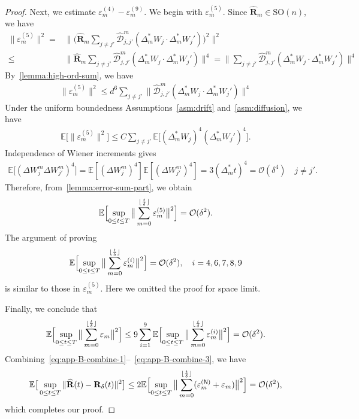\documentclass[11pt, a4paper, onecolumn]{article}
\newcommand{\SOn}{\mathrm{SO}(n)}
\newcommand{\E}{\mathbb{E}}
\newcommand{\m}{m}
\newcommand{\bfR}{\mathbf{R}}
\newcommand{\hatR}{\widehat{\bfR}}
\newcommand{\hatD}{\widehat{\tg D}}
\newcommand{\tg}[1]{\mathcal{#1}}
\newcommand{\nm}[1]{\mathsf{#1}}
\newcommand{\calO}{\mathcal{O}}
\newcommand{\Dms}{{\Delta^{*}_{m}}}
\newcommand{\hDjjpms}{ {\hatD_{j,j'}^{\m}} }
\newcommand{\sumub}{{\lfloor \frac{t}{\delta} \rfloor}}
\newcommand{\ermn}[1]{\varepsilon_m^{(#1)}}
\newcommand{\EsupN}[1]{\E\Bigl[ \sup_{0 \le t\le T} \big\| \sum_{m=0}^{\sumub} #1 \big\|^2 \Bigr]}
\begin{document}
\begin{appendices}
\begin{proof}
Next, we estimate $\ermn{4}-\ermn{9}$. We begin with $\ermn{5}$. Since $\hatR_{m}\in\SOn$, we have
    \begin{align*}
        \| \ermn{5}\|^2 = &  \Big\| \Big( \hatR_m \sum_{j\neq j'} \hDjjpms (\Dms W_j \cdot \Dms W_j')\Big)^2 \Big\|^2 \\
                        \le &  \Big\|  \hatR_m \sum_{j\neq j'} \hDjjpms (\Dms W_j \cdot \Dms W_j') \Big\|^4 =  \Big\|  \sum_{j\neq j'} \hDjjpms (\Dms W_j \cdot \Dms W_j') \Big\|^4
    \end{align*}    
    By~\cref{lemma:high-ord-sum}, we have
    \begin{align*}
         \| \ermn{5}\|^2 \le d^6 \sum_{j\neq j'} \|\hDjjpms (\Dms W_j \cdot \Dms W_j') \|^4 
    \end{align*}
    Under the uniform boundedness Assumptions~\ref{asm:drift} and~\ref{asm:diffusion}, we have
    \begin{align*}
        \E\big[\| \ermn{5}\|^2\big] \le C\sum_{j\neq j'} \E\big[(\Dms W_j)^4 (\Dms W_j')^4\big].
    \end{align*}
    Independence of Wiener increments gives
    \begin{align*}
       \mathbb E \bigl[(\Delta W_{j}^{m}\Delta W_{j'}^{m})^{4}\bigr] = \mathbb E[(\Delta W_{j}^{m})^{4}] \mathbb E[(\Delta W_{j'}^{m})^{4}] =3(\Dms t)^4 = \calO(\delta^4) \quad j\neq j'.
    \end{align*}
    Therefore, from~\cref{lemma:error-sum-part}, we obtain
    \begin{align*}
        \EsupN{\ermn{5}} = \calO(\delta^2).
    \end{align*}
The argument of proving 
\begin{align*}
     \EsupN{\ermn{i}} = \calO(\delta^2), \quad  i=4,6,7,8,9
\end{align*}
is similar to those in $\ermn{5}$. Here we omitted the proof for space limit.

Finally, we conclude that
\begin{align}\label{eq:app-B-combine-3}
    \EsupN{ \varepsilon_m} \le 9 \sum_{i=1}^9  \EsupN{\ermn{i}} = \mathcal O(\delta^{2}).
\end{align}
Combining~\eqref{eq:app-B-combine-1}--~\eqref{eq:app-B-combine-3}, we have
\begin{align*}
    \E\big[ \sup_{0 \le t\le T}\| \hatR(t)- \bfR_\delta(t) \|^2 \big] \le 2 \EsupN{(\ermn{\nm N} + \varepsilon_m)} = \calO(\delta^2),
\end{align*}
which completes our proof.
    

\end{proof}
\end{appendices}
\end{document}
